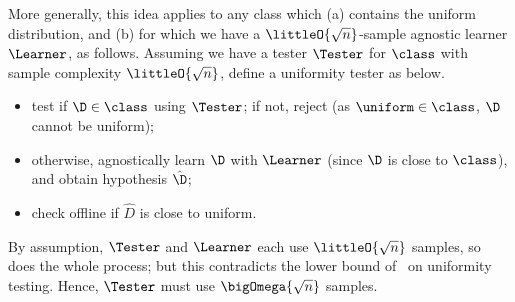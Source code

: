 More generally, this idea applies to any class \class which \textsf{(a)} contains the uniform distribution, and \textsf{(b)} for which we have a $\littleO{\sqrt{n}}$-sample agnostic learner $\Learner$, as follows.
Assuming we have a tester $\Tester$ for $\class$ with sample complexity $\littleO{\sqrt{n}}$, define a uniformity tester as below.
\begin{itemize}
  \item test if $\D\in\class$ using $\Tester$; if not, reject (as $\uniform\in\class$, $\D$ cannot be uniform);
  \item otherwise, agnostically learn $\D$ with $\Learner$ (since $\D$ is close to $\class$), and obtain hypothesis $\hat{\D}$;
  \item check offline if $\hat{D}$ is close to uniform.
\end{itemize} 
By assumption, $\Tester$ and $\Learner$ each use $\littleO{\sqrt{n}}$ samples, so does the whole process; but this contradicts the lower bound of~\cite{BFRSW:00,Paninski:08} on uniformity testing. Hence, $\Tester$ must use $\bigOmega{\sqrt{n}}$ samples.\medskip

